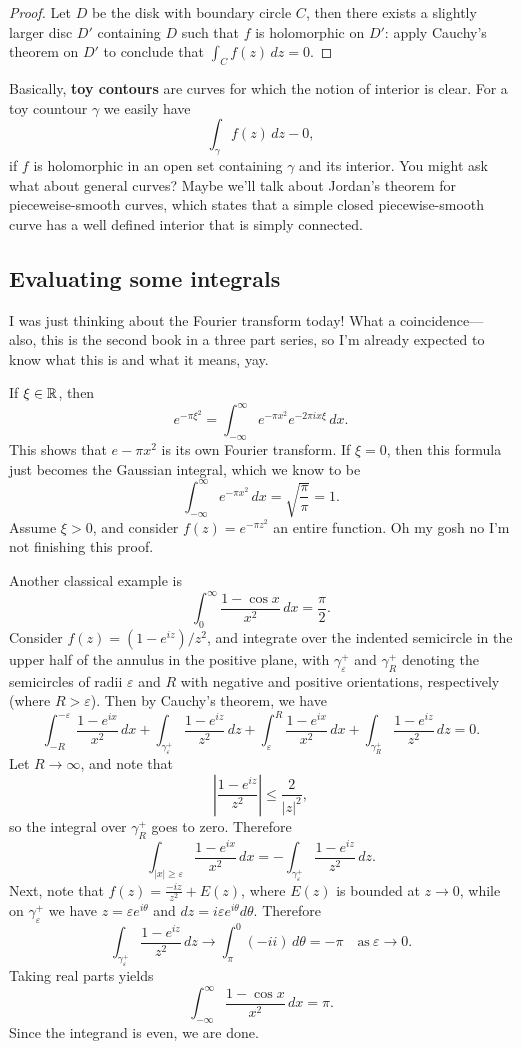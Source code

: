 \begin{proof}
    Let $D$ be the disk with boundary circle $C$, then there exists a slightly larger disc  $D'$ containing $D$ such that $f$ is holomorphic on $D'$: apply Cauchy's theorem on $D'$ to conclude that $\int_{C}^{} f(z) \, dz=0$.
\end{proof}
Basically, \textbf{toy contours} are curves for which the notion of interior is clear. For a toy countour $\gamma$ we easily have \[
    \int_{\gamma}^{} f(z) \, dz-0,
\] if $f$ is holomorphic in an open set containing $\gamma$ and its interior. You might ask what about general curves? Maybe we'll talk about Jordan's theorem for pieceweise-smooth curves, which states that a simple closed piecewise-smooth curve has a well defined interior that is simply connected.
\subsection{Evaluating some integrals}
I was just thinking about the Fourier transform today! What a coincidence— also, this is the second book in a three part series, so I'm already expected to know what this is and what it means, yay.
\begin{example}
    If $\xi \in \mathbb{R}$, then \[
    e^{-\pi \xi^2}=\int_{-\infty}^{\infty} e^{-\pi x^2}e^{-2\pi ix \xi} \, dx.
    \] This shows that $e-\pi x^2$ is its own Fourier transform. If $\xi=0$, then this formula just becomes the Gaussian integral, which we know to be \[
    \int_{-\infty}^{\infty} e^{-\pi x^2} \, dx=\sqrt{\frac{\pi}{\pi}} =1.
\] Assume $\xi >0$, and consider $f(z)=e^{-\pi z^2}$ an entire function. Oh my gosh no I'm not finishing this proof.
\end{example}
\begin{example}
    Another classical example is \[
    \int_{0}^{\infty} \frac{1-\cos x}{x^2} \, dx=\frac{\pi}{2}.
\] Consider $f(z)=(1-e^{iz}) / z^2$, and integrate over the indented semicircle in the upper half of the annulus in the positive plane, with $\gamma_{\varepsilon }^+$ and $\gamma_R^+$ denoting the semicircles of radii $\varepsilon $ and $R$ with negative and positive orientations, respectively (where $R>\varepsilon $). Then by Cauchy's theorem, we have \[
\int_{-R}^{-\varepsilon } \frac{1-e^{ix}}{x^2} \, dx+ \int_{\gamma_{\varepsilon }^+}^{} \frac{1-e^{iz}}{z^2} \, dz+ \int_{\varepsilon }^{R} \frac{1-e^{ix}}{x^2} \, dx+ \int_{\gamma_R^+}^{} \frac{1-e^{iz}}{z^2} \, dz=0.
\] Let $R\to \infty$, and note that \[
\left| \frac{1-e^{iz}}{z^2} \right| \leq \frac{2}{|z|^2},
\] so the integral over $\gamma_R^+$ goes to zero. Therefore \[
\int_{|x|\geq \varepsilon }^{} \frac{1-e^{ix}}{x^2} \, dx=- \int_{\gamma_{\varepsilon }^+}^{} \frac{1-e^{iz}}{z^2} \, dz.
\] Next, note that $f(z)=\frac{-iz}{z^2}+E(z)$, where $E(z)$ is bounded at $z\to 0$, while on $\gamma_{\varepsilon }^+$ we have $z=\varepsilon  e^{i\theta}$ and $dz=i\varepsilon  e^{i\theta}d\theta$. Therefore \[
\int_{\gamma_{\varepsilon }^+}^{} \frac{1-e^{iz}}{z^2} \, dz\to \int_{\pi}^{0} (-ii) \, d\theta=-\pi \quad \text{as} \ \varepsilon \to 0.
\] Taking real parts yields \[
\int_{-\infty}^{\infty} \frac{1-\cos x}{x^2} \, dx=\pi.
\] Since the integrand is even, we are done.
\end{example}

